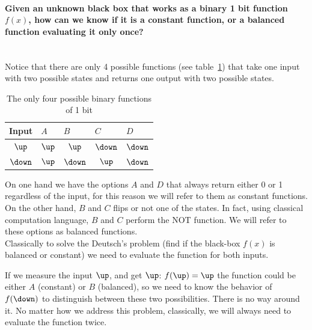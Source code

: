 \paragraph{Given an unknown black box that works as a binary 1 bit function $f(x)$, how can we know if it is a constant function, or a balanced function evaluating it only once?\\}
\textcolor{white}{.}\\
Notice that there are only 4 possible functions (see table~\ref{binfunc}) that take one input with two possible states and returns one output with two possible states.
\begin{table}[h!]
\begin{center}
\begin{tabular}{c|c|c|c|c}
\multicolumn{1}{l|}{Input} & \multicolumn{1}{l|}{$A$} & \multicolumn{1}{l|}{$B$} & \multicolumn{1}{l|}{$C$} & \multicolumn{1}{l}{$D$} \\ \hline
$\up$ & $\up$ & $\up$ & $\down$ & $\down$ \\ %
$\down$ & $\up$ & $\down$ & $\up$ & $\down$ \\ %
\end{tabular}
\end{center}
\vspace{-15pt}\caption{The only four possible binary functions of 1 bit}
\label{binfunc}
\end{table}

On one hand we have the options $A$ and $D$ that always return either 0 or 1 regardless of the input, for this reason we will refer to them as constant functions.
On the other hand, $B$ and $C$ flips or not one of the states. In fact, using classical computation language, $B$ and $C$ perform the NOT function. We will refer to these options as balanced functions.\\

Classically to solve the Deutsch's problem (find if the black-box $f(x)$ is balanced or constant) we need to evaluate the function for both inputs.

If we measure the input $\up$, and get $\up$: $f(\up)=\up$ the function could be either $A$ (constant) or $B$ (balanced), so we need to know the behavior of $f(\down)$ to distinguish between these two possibilities.
There is no way around it. No matter how we address this problem, classically, we will always need to evaluate the function twice.

